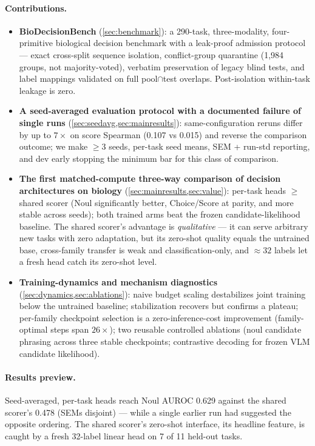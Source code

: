 \paragraph{Contributions.}
\begin{itemize}
\item \textbf{BioDecisionBench} (\cref{sec:benchmark}): a 290-task, three-modality,
four-primitive biological decision benchmark with a leak-proof admission protocol --- exact
cross-split sequence isolation, conflict-group quarantine (1{,}984 groups, not
majority-voted), verbatim preservation of legacy blind tests, and label mappings validated
on full pool$\cap$test overlaps. Post-isolation within-task leakage is zero.
\item \textbf{A seed-averaged evaluation protocol with a documented failure of single runs}
(\cref{sec:seedavg,sec:mainresults}): same-configuration reruns differ by up to
$7\times$ on score Spearman (0.107 vs 0.015) and reverse the comparison outcome; we make
$\ge3$ seeds, per-task seed means, SEM + run-std reporting, and dev early stopping the
minimum bar for this class of comparison.
\item \textbf{The first matched-compute three-way comparison of decision architectures on
biology} (\cref{sec:mainresults,sec:value}): per-task heads $\ge$ shared scorer (Noul
significantly better, Choice/Score at parity, and more stable across seeds); both trained
arms beat the frozen candidate-likelihood baseline. The shared scorer's advantage is
\emph{qualitative} --- it can serve arbitrary new tasks with zero adaptation, but its
zero-shot quality equals the untrained base, cross-family transfer is weak and
classification-only, and ${\approx}32$ labels let a fresh head catch its zero-shot level.
\item \textbf{Training-dynamics and mechanism diagnostics} (\cref{sec:dynamics,sec:ablations}):
naive budget scaling destabilizes joint training below the untrained baseline; stabilization
recovers but confirms a plateau; per-family checkpoint selection is a zero-inference-cost
improvement (family-optimal steps span $26\times$); two reusable controlled ablations
(noul candidate phrasing across three stable checkpoints; contrastive decoding for frozen
VLM candidate likelihood).
\end{itemize}

\paragraph{Results preview.}
Seed-averaged, per-task heads reach Noul AUROC 0.629 against the shared scorer's 0.478
(SEMs disjoint) --- while a single earlier run had suggested the opposite ordering. The
shared scorer's zero-shot interface, its headline feature, is caught by a fresh 32-label
linear head on 7 of 11 held-out tasks.

